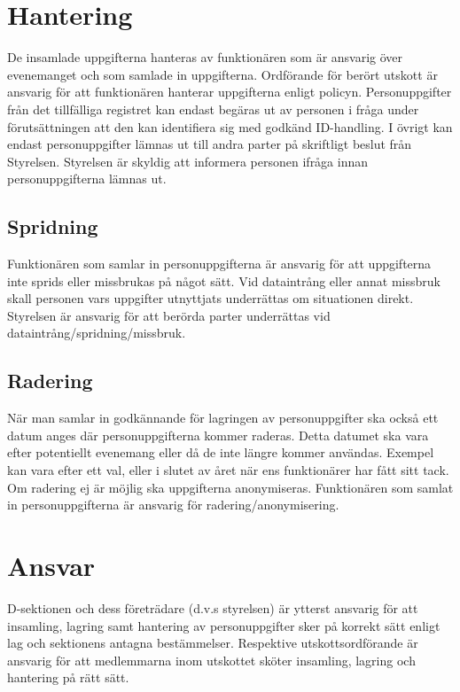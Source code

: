 \documentclass{dsekprotokoll}
\begin{document}
\section{Hantering}
De insamlade uppgifterna hanteras av funktionären som är ansvarig över evenemanget och som samlade
in uppgifterna. Ordförande för berört utskott är ansvarig för att funktionären hanterar uppgifterna enligt policyn. Personuppgifter från det tillfälliga registret kan endast begäras ut av personen i fråga under förutsättningen att den kan identifiera sig med godkänd ID-handling. I övrigt kan endast personuppgifter lämnas ut till andra parter på skriftligt beslut från Styrelsen. Styrelsen är skyldig att informera personen ifråga innan personuppgifterna lämnas ut.

\subsection{Spridning}
Funktionären som samlar in personuppgifterna är ansvarig för att uppgifterna inte sprids eller missbrukas på något sätt. Vid dataintrång eller annat missbruk skall personen vars uppgifter utnyttjats underrättas om situationen direkt. Styrelsen är ansvarig för att berörda parter underrättas vid dataintrång/spridning/missbruk.

\subsection{Radering}
När man samlar in godkännande för lagringen av personuppgifter ska också ett datum anges
där personuppgifterna kommer raderas. Detta datumet ska vara efter potentiellt evenemang
eller då de inte längre kommer användas. Exempel kan vara efter ett val, eller i slutet av året
när ens funktionärer har fått sitt tack. Om radering ej är möjlig ska
uppgifterna anonymiseras. Funktionären som samlat in personuppgifterna är ansvarig för
radering/anonymisering.

\section{Ansvar}
D-sektionen och dess företrädare (d.v.s styrelsen) är ytterst ansvarig för att insamling, lagring samt hantering av personuppgifter sker på korrekt sätt enligt lag och sektionens antagna bestämmelser. Respektive utskottsordförande är ansvarig för att medlemmarna inom utskottet
sköter insamling, lagring och hantering på rätt sätt.
\end{document}
